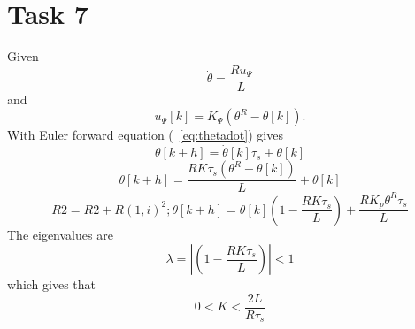\documentclass[a4paper,12pt,oneside,onecolumn]{article} %
\begin{document}
\section*{Task 7}
 	Given
	\begin{equation}
		\dot{\theta} = \frac{Ru_\Psi}{L}
		 \label{eq:thetadot}
	\end{equation}
	and
	\begin{equation}
		u_\Psi{[k]} = K_{\Psi}({\theta}^R  - {\theta}[k]).
	\end{equation}
	With Euler forward equation (~\ref{eq:thetadot}) gives
	\begin{equation}
		\theta[k+h] = \dot{\theta}[k]\tau_s + \theta[k]
	\end{equation}
	\begin{equation}
		\theta[k+h] = \frac{RK\tau_s({\theta}^R  - {\theta}[k])}{L} + \theta[k]
	\end{equation}
	\begin{equation}
R2 = R2 + R(1,i)^2;		\theta[k+h] =\theta[k](1-\frac{RK\tau_s}{L}) + \frac{RK_p\theta^R\tau_s}{L}
	\end{equation}
The eigenvalues are
	\begin{equation}
		\lambda = \left|{(1-\frac{RK\tau_s}{L})}\right| < 1
	\end{equation}
	which gives that 
	\begin{equation}
		0 < K < \frac{2L}{R\tau_s}
	\end{equation}
\end{document}
